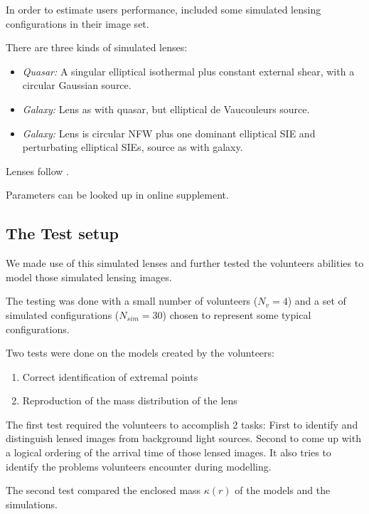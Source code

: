 In order to estimate users performance, \sw included some simulated lensing configurations in their image set.

There are three kinds of simulated lenses:

\begin{itemize}
  \item {\em Quasar:\/} A singular elliptical isothermal plus constant
    external shear, with a circular Gaussian source.
  \item {\em Galaxy:\/} Lens as with quasar, but elliptical de
    Vaucouleurs source.
  \item {\em Galaxy:\/} Lens is circular NFW plus one dominant
    elliptical SIE and perturbating elliptical SIEs, source as with
    galaxy.
\end{itemize}
Lenses follow \cite{2001astro.ph..2341K,2001astro.ph..2340K}.

Parameters can be looked up in online supplement.


\subsection{The Test setup} \label{sec:testsetup}
We made use of this simulated lenses and further tested the volunteers abilities to model those simulated lensing images.

The testing was done with a small number of volunteers ($N_v=4$) and a set of simulated configurations ($N_{sim}=30$) chosen to represent some typical configurations.

Two tests were done on the models created by the volunteers:

\begin{enumerate}
  \item Correct identification of extremal points
  \item Reproduction of the mass distribution of the lens
\end{enumerate}

The first test required the volunteers to accomplish 2 tasks: First to identify and distinguish lensed images from background light sources.
Second to come up with a logical ordering of the arrival time of those lensed images.
It also tries to identify the problems volunteers encounter during modelling.

The second test compared the enclosed mass $\kappa(r)$ of the models and the simulations.
